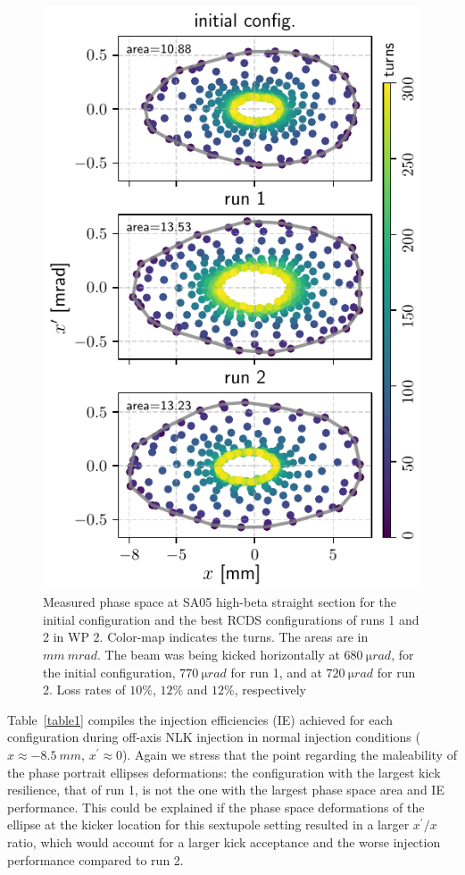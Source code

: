 \begin{figure}[!h]
    \hfill
    \begin{minipage}{0.48\textwidth}
        \includegraphics[width=\textwidth]{Images/WEPL087_f4.pdf}
        \caption{Measured phase space at SA05 high-beta straight section for the initial configuration and the best RCDS configurations of runs 1 and 2 in WP 2. Color-map indicates the turns. The areas are in $\unit{mm}~\unit{mrad}$. The beam was being kicked horizontally at $680~\unit{\micro rad}$, for the initial configuration, $770~\unit{\micro rad}$ for run 1, and at $720~\unit{\micro rad}$ for run 2. Loss rates of $10\%$, $12\%$ and $12\%$, respectively}
        \label{fig:newtunes_phase}
    \end{minipage}

\end{figure}
Table~\ref{table1} compiles the injection efficiencies (IE) achieved for each configuration during off-axis NLK injection in normal injection conditions ($x\approx -8.5~\unit{mm}$, $x^\prime\approx 0 $).
Again we stress that the point regarding the maleability of the phase portrait ellipses deformations: the configuration with the largest kick resilience, that of run 1, is not the one with the largest phase space area and IE performance. This could be explained if the phase space deformations of the ellipse at the kicker location for this sextupole setting resulted in a larger $x^\prime/x$ ratio, which would account for a larger kick acceptance and the worse injection performance compared to run 2.

